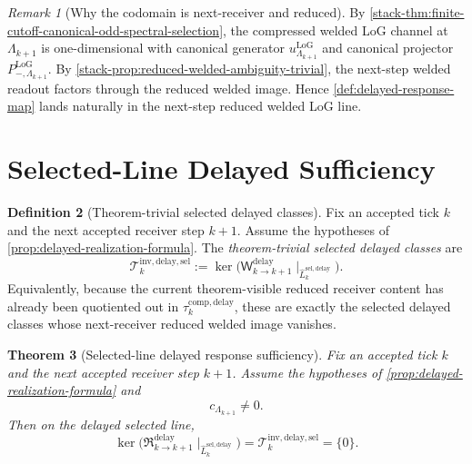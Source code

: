 \documentclass[11pt]{article}
\theoremstyle{definition}
\newtheorem{definition}{Definition}[section]
\theoremstyle{plain}
\newtheorem{theorem}[definition]{Theorem}
\theoremstyle{remark}
\newtheorem{remark}[definition]{Remark}
\begin{document}
\begin{remark}[Why the codomain is next-receiver and reduced]
\label{rem:delay-codomain}
By \cref{stack-thm:finite-cutoff-canonical-odd-spectral-selection}, the compressed welded LoG
channel at \(\Lambda_{k+1}\) is one-dimensional with canonical generator
\(u^{\mathrm{LoG}}_{\Lambda_{k+1}}\) and canonical projector
\(P^{\mathrm{LoG}}_{-,\Lambda_{k+1}}\).
By \cref{stack-prop:reduced-welded-ambiguity-trivial}, the next-step welded readout factors through
the reduced welded image.
Hence \cref{def:delayed-response-map} lands naturally in the next-step reduced welded LoG line.
\end{remark}

\section{Selected-Line Delayed Sufficiency}

\begin{definition}[Theorem-trivial selected delayed classes]
\label{def:delayed-selected-trivial}
Fix an accepted tick \(k\) and the next accepted receiver step \(k+1\).
Assume the hypotheses of \cref{prop:delayed-realization-formula}.
The \emph{theorem-trivial selected delayed classes} are
\[
\mathcal T^{\mathrm{inv,delay,sel}}_k
:=
\ker\!\bigl(
\mathsf W^{\mathrm{delay}}_{k\to k+1}
\!\mid_{\widehat L^{\mathrm{sel,delay}}_k}
\bigr).
\]
Equivalently, because the current theorem-visible reduced receiver content has already been quotiented
out in \(\tau^{\mathrm{comp,delay}}_k\), these are exactly the selected delayed classes whose
next-receiver reduced welded image vanishes.
\end{definition}

\begin{theorem}[Selected-line delayed response sufficiency]
\label{thm:delayed-response-sufficiency}
Fix an accepted tick \(k\) and the next accepted receiver step \(k+1\).
Assume the hypotheses of \cref{prop:delayed-realization-formula} and
\[
c_{\Lambda_{k+1}}\neq 0.
\]
Then on the delayed selected line,
\[
\ker\!\bigl(
\mathfrak R^{\mathrm{delay}}_{k\to k+1}
\!\mid_{\widehat L^{\mathrm{sel,delay}}_k}
\bigr)
=
\mathcal T^{\mathrm{inv,delay,sel}}_k
=
\{0\}.
\]
\end{theorem}
\end{document}
